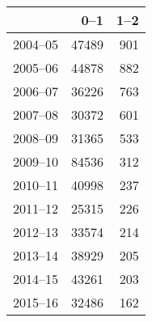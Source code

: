 \begin{table}[ht]
\centering
\begin{tabular}{rrr}
  \hline
 & 0--1 & 1--2 \\ 
  \hline
2004--05 & 47489 & 901 \\ 
  2005--06 & 44878 & 882 \\ 
  2006--07 & 36226 & 763 \\ 
  2007--08 & 30372 & 601 \\ 
  2008--09 & 31365 & 533 \\ 
  2009--10 & 84536 & 312 \\ 
  2010--11 & 40998 & 237 \\ 
  2011--12 & 25315 & 226 \\ 
  2012--13 & 33574 & 214 \\ 
  2013--14 & 38929 & 205 \\ 
  2014--15 & 43261 & 203 \\ 
  2015--16 & 32486 & 162 \\ 
   \hline
\end{tabular}
\end{table}
